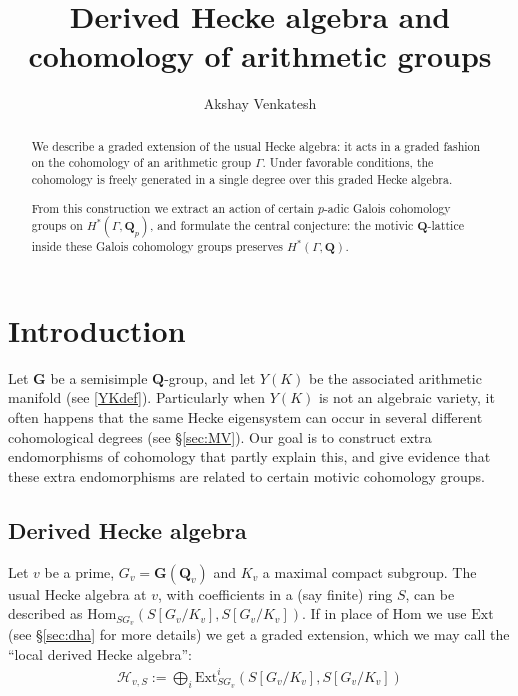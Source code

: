 \documentclass[10pt]{amsart}
\newcommand{\Ext}{\mathrm{Ext}}
\newcommand{\Hom}{\mathrm{Hom}}
\newcommand{\Q}{\mathbf{Q}}
\theoremstyle{remark}
\newcommand{\GG}{\mathbf{G}}
\begin{document}
 

\setcounter{tocdepth}{1}
\title{Derived Hecke algebra and   cohomology of arithmetic groups}
\author{Akshay Venkatesh}


 \begin{abstract}
 
We describe a graded extension of the usual Hecke algebra: it acts
in a graded fashion on the cohomology of an arithmetic group $\Gamma$. Under favorable conditions,
the cohomology is freely generated in a single degree over this graded Hecke algebra. 

From this construction we extract an action of certain $p$-adic Galois cohomology 
groups on $H^*(\Gamma, \Q_p)$, and formulate the central conjecture: 
the motivic $\Q$-lattice inside these Galois cohomology groups preserves $H^*(\Gamma,\Q)$.
    \end{abstract}
\maketitle

    \tableofcontents

 
\section{Introduction}

Let  $\GG$ be a   semisimple $\Q$-group, and let $Y(K)$ 
be the associated arithmetic manifold (see   \eqref{YKdef}). 
 Particularly when $Y(K)$ is not an algebraic variety, it often happens
that the same Hecke eigensystem can occur in several different cohomological degrees (see \S \ref{sec:MV}). 
Our goal is to construct extra endomorphisms of cohomology that partly explain this,
 and give evidence that these extra endomorphisms are related to certain motivic cohomology groups. 
  
\subsection{Derived Hecke algebra}\label{introdha}
 Let $v$ be a prime, $G_v = \GG(\Q_v)$ and $K_v$ a maximal compact subgroup. The  usual Hecke algebra at $v$, with  coefficients in a (say finite) ring $S$,  can be described as    $  \Hom_{S G_v} \left(  S[G_v/K_v],  S[G_v/K_v] \right).$
 If in place of $\Hom$ we use $\Ext$ (see \S \ref{sec:dha} for more details)
 we get a graded extension, which we  may call the ``local derived Hecke algebra'':
\begin{eqnarray} \label{extdef} \mathscr{H}_{v,S} :=  \bigoplus_i \Ext^i_{S G_v} \left(  S[G_v/K_v],  S[G_v/K_v] \right) 
\end{eqnarray}
 
\end{document}
